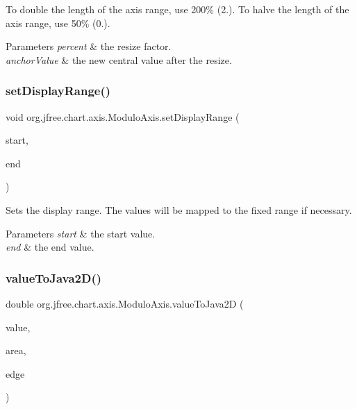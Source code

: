 To double the length of the axis range, use 200\% (2.). To halve the length of the axis range, use 50\% (0.).


\begin{DoxyParams}{Parameters}
{\em percent} & the resize factor. \\
\hline
{\em anchor\+Value} & the new central value after the resize. \\
\hline
\end{DoxyParams}
\mbox{\label{classorg_1_1jfree_1_1chart_1_1axis_1_1_modulo_axis_af962bfba0673ec9f40ca70afa99b2567}} 
\subsubsection{\texorpdfstring{set\+Display\+Range()}{setDisplayRange()}}
{\footnotesize\ttfamily void org.\+jfree.\+chart.\+axis.\+Modulo\+Axis.\+set\+Display\+Range (\begin{DoxyParamCaption}\item[{double}]{start,  }\item[{double}]{end }\end{DoxyParamCaption})}

Sets the display range. The values will be mapped to the fixed range if necessary.


\begin{DoxyParams}{Parameters}
{\em start} & the start value. \\
\hline
{\em end} & the end value. \\
\hline
\end{DoxyParams}
\mbox{\label{classorg_1_1jfree_1_1chart_1_1axis_1_1_modulo_axis_a0c097f38b1301f9f0f247a08f20532f0}} 
\subsubsection{\texorpdfstring{value\+To\+Java2\+D()}{valueToJava2D()}}
{\footnotesize\ttfamily double org.\+jfree.\+chart.\+axis.\+Modulo\+Axis.\+value\+To\+Java2D (\begin{DoxyParamCaption}\item[{double}]{value,  }\item[{Rectangle2D}]{area,  }\item[{Rectangle\+Edge}]{edge }\end{DoxyParamCaption})}

